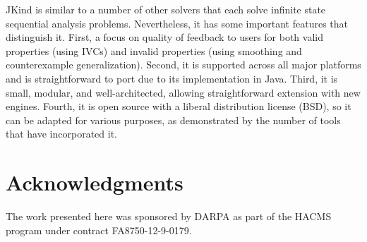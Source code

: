\documentclass{llncs}
\newcommand{\jkind}{{\sc JKind}\xspace}
\newcommand{\lustre}{{\sc Lustre}\xspace}
\renewcommand{\paragraph}[1]{\vspace{5pt}\noindent {\bf #1}}
\begin{document}

\paragraph{Conclusion}
\jkind is similar to a number of other solvers that each solve
infinite state sequential analysis problems. Nevertheless, it has some
important features that distinguish it. First, a focus on quality of
feedback to users for both valid properties (using IVCs) and invalid
properties (using smoothing and counterexample generalization).
Second, it is supported across all major platforms and is
straightforward to port due to its implementation in Java. Third, it
is small, modular, and well-architected, allowing straightforward
extension with new engines. Fourth, it is open source with a liberal
distribution license (BSD), so it can be adapted for various purposes,
as demonstrated by the number of tools that have incorporated it.

\section{Acknowledgments}

The work presented here was sponsored by DARPA as part of the HACMS
program under contract FA8750-12-9-0179.

{}

\end{document}

